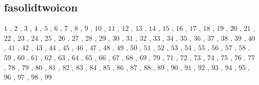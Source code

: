 \subsection{fasolidtwoicon}

$1$ , $2$ , $3$ , $4$ , $5$ , $6$ , $7$ , $8$ , $9$ , $10$ , $11$ , $12$ , $13$ , $14$ , $15$ , $16$ , $17$ , $18$ , $19$ , $20$ , $21$ , $22$ , $23$ , $24$ , $25$ , $26$ , $27$ , $28$ , $29$ , $30$ , $31$ , $32$ , $33$ , $34$ , $35$ , $36$ , $37$ , $38$ , $39$ , $40$ , $41$ , $42$ , $43$ , $44$ , $45$ , $46$ , $47$ , $48$ , $49$ , $50$ , $51$ , $52$ , $53$ , $54$ , $55$ , $56$ , $57$ , $58$ , $59$ , $60$ , $61$ , $62$ , $63$ , $64$ , $65$ , $66$ , $67$ , $68$ , $69$ , $70$ , $71$ , $72$ , $73$ , $74$ , $75$ , $76$ , $77$ , $78$ , $79$ , $80$ , $81$ , $82$ , $83$ , $84$ , $85$ , $86$ , $87$ , $88$ , $89$ , $90$ , $91$ , $92$ , $93$ , $94$ , $95$ , $96$ , $97$ , $98$ , $99$ 

